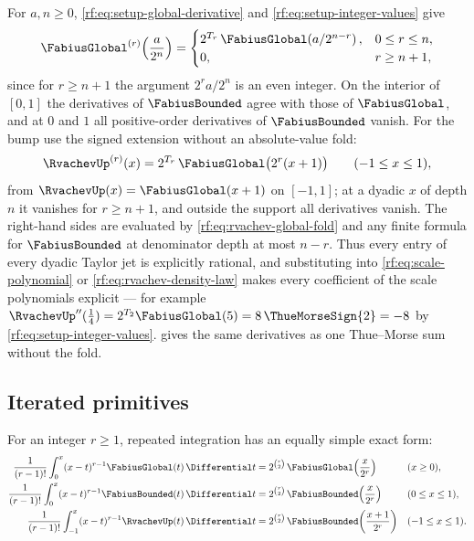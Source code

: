 \documentclass[11pt,oneside]{article}
\theoremstyle{plain}
\theoremstyle{definition}
\theoremstyle{remark}
\newcommand{\Fb}{\FabiusBounded}            %
\newcommand{\Fg}{\FabiusGlobal}             %
\newcommand{\up}{\RvachevUp}                %
\newcommand{\tm}[1]{\ThueMorseSign{#1}}     %
\newcommand{\dd}{\Differential}
\newcommand{\Tr}[1]{T_{#1}}                 %
\begin{document}
For $a,n\ge0$, \cref{rf:eq:setup-global-derivative} and
\cref{rf:eq:setup-integer-values} give
\begin{equation}
 \Fg^{(r)}\!\left(\frac{a}{2^{n}}\right)=
 \begin{cases}
 2^{\Tr{r}}\,\Fg\!\left(a/2^{n-r}\right), & 0\le r\le n,\\
 0, & r\ge n+1,
 \end{cases}
 \label{rf:eq:rvachev-derivatives-global}
\end{equation}
since for $r\ge n+1$ the argument $2^{r}a/2^{n}$ is an even integer.  On the
interior of $[0,1]$ the derivatives of $\Fb$ agree with those of $\Fg$, and
at $0$ and $1$ all positive-order derivatives of $\Fb$ vanish.  For the bump
use the signed extension without an absolute-value fold:
\begin{equation}
 \up^{(r)}(x)=2^{\Tr{r}}\,\Fg\bigl(2^{r}(x+1)\bigr)\qquad(-1\le x\le1),
 \label{rf:eq:rvachev-up-derivatives}
\end{equation}
from $\up(x)=\Fg(x+1)$ on $[-1,1]$; at a dyadic $x$ of depth $n$ it
vanishes for $r\ge n+1$, and outside the support all derivatives vanish.
The right-hand sides are evaluated by \cref{rf:eq:rvachev-global-fold} and
any finite formula for $\Fb$ at denominator depth at most $n-r$.  Thus
every entry of every dyadic Taylor jet is explicitly rational, and
substituting into \cref{rf:eq:scale-polynomial} or
\cref{rf:eq:rvachev-density-law} makes every coefficient of the scale
polynomials explicit --- for example
$\up''(\tfrac14)=2^{\Tr{2}}\Fg(5)=8\,\tm{2}=-8$ by
\cref{rf:eq:setup-integer-values}.   gives the
same derivatives as one Thue--Morse sum without the fold.

\subsection{Iterated primitives}
\label{rf:sec:rvachev-primitives}

For an integer $r\ge1$, repeated integration has an equally simple exact
form:
\begin{align}
 \frac{1}{(r-1)!}\int_{0}^{x}(x-t)^{r-1}\Fg(t)\,\dd t
 &=2^{\binom{r}{2}}\,\Fg\!\left(\frac{x}{2^{r}}\right) &&(x\ge0),
 \label{rf:eq:rvachev-primitive-global}\\
 \frac{1}{(r-1)!}\int_{0}^{x}(x-t)^{r-1}\Fb(t)\,\dd t
 &=2^{\binom{r}{2}}\,\Fb\!\left(\frac{x}{2^{r}}\right) &&(0\le x\le1),
 \label{rf:eq:rvachev-primitive-F}\\
 \frac{1}{(r-1)!}\int_{-1}^{x}(x-t)^{r-1}\up(t)\,\dd t
 &=2^{\binom{r}{2}}\,\Fb\!\left(\frac{x+1}{2^{r}}\right) &&(-1\le x\le1).
 \label{rf:eq:rvachev-primitive-up}
\end{align}
\end{document}

